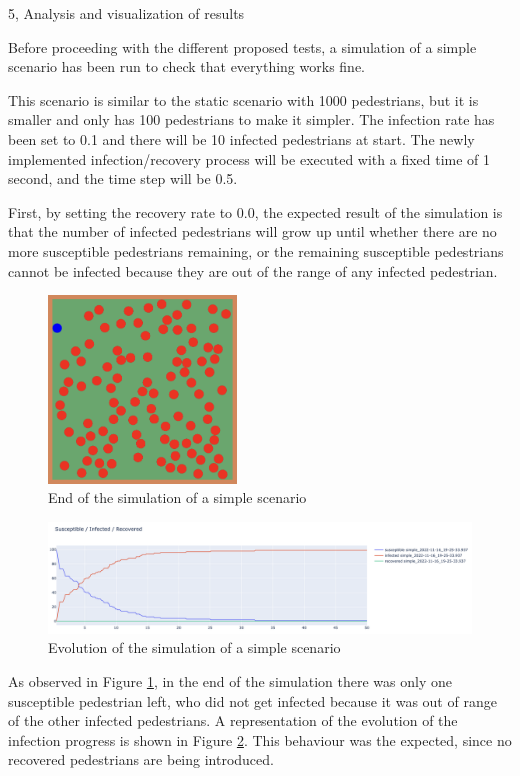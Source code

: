 \documentclass[10pt,a4paper]{article}
\begin{document}
\begin{task}{5, Analysis and visualization of results}

Before proceeding with the different proposed tests, a simulation of a simple scenario has been run to check that everything works fine.

This scenario is similar to the static scenario with 1000 pedestrians, but it is smaller and only has 100 pedestrians to make it simpler. The infection rate has been set to 0.1 and there will be 10 infected pedestrians at start. The newly implemented infection/recovery process will be executed with a fixed time of 1 second, and the time step will be 0.5.

First, by setting the recovery rate to 0.0, the expected result of the simulation is that the number of infected pedestrians will grow up until whether there are no more susceptible pedestrians remaining, or the remaining susceptible pedestrians cannot be infected because they are out of the range of any infected pedestrian.

\begin{figure} [H]
    \includegraphics[width=5cm]{images/simple.png}
    \centering
    \caption{End of the simulation of a simple scenario}
    \label{simple}
 \end{figure}
 
\begin{figure} [H]
    \includegraphics[width=15cm]{images/simple_evolution.png}
    \centering
    \caption{Evolution of the simulation of a simple scenario}
    \label{simple_evolution}
\end{figure}

As observed in Figure \ref{simple}, in the end of the simulation there was only one susceptible pedestrian left, who did not get infected because it was out of range of the other infected pedestrians. A representation of the evolution of the infection progress is shown in Figure \ref{simple_evolution}. This behaviour was the expected, since no recovered pedestrians are being introduced.


\end{task}
\end{document}
